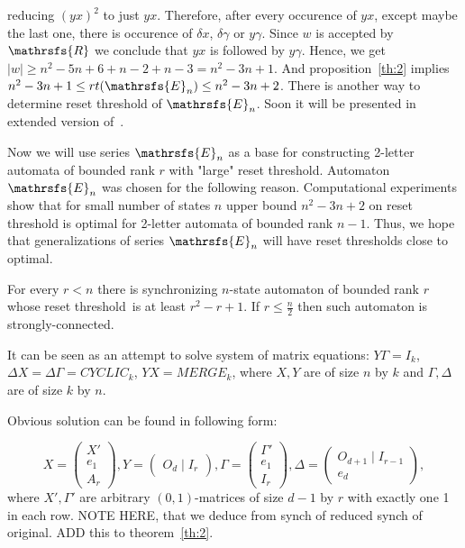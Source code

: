 \documentclass[11pt]{llncs}
\newcommand{\rl}{reset threshold}
\newcommand{\R}{\mathrsfs{R}}
\newcommand{\G}{\Gamma}
\newcommand{\D}{\Delta}
\newcommand{\g}{\gamma}
\newcommand{\dl}{\delta}
\newcommand{\rt}{rt}
\newcommand{\rtc}{rt_{c}}
\begin{document}
reducing $(yx)^2$ to just $yx$. Therefore, after every occurence of $yx$, except maybe the last one, there is occurence 
of $\dl x$, $\dl \g$ or $y \g$. Since $w$ is accepted by $\R$ we conclude that $yx$ is followed by $y\g$.
Hence, we get $|w| \geq n^2 - 5n + 6 + n - 2 + n - 3 = n^2 -3n + 1$.
And proposition~\ref{th:2} implies $n^2 -3n + 1 \leq \rt(\mathrsfs{E}_n) \leq n^2 -3n + 2$. 
There is another way to determine reset threshold of $\mathrsfs{E}_n$. Soon it will be presented in
extended version of~\cite{AGV}.

Now we will use series $\mathrsfs{E}_n$ as a base for constructing 2-letter automata of bounded
rank $r$ with "large" reset threshold. Automaton $\mathrsfs{E}_n$ was chosen for the following reason.
Computational experiments show that for small number of states $n$ upper bound $n^2 -3n +2$ on reset threshold is optimal
for 2-letter automata of bounded rank $n - 1$.
Thus, we hope that generalizations of series $\mathrsfs{E}_n$ will have reset thresholds close to optimal.

\begin{proposition}
For every $r < n$ there is synchronizing $n$-state automaton of bounded rank $r$ whose \rl\ is at least 
$r^2 -r + 1$. If $r \leq \frac{n}{2}$ then such automaton is strongly-connected.
\end{proposition}

It can be seen as an attempt to solve system of matrix equations:
$Y\G = I_{k}$, $\D X = \D \G = CYCLIC_{k}$, $YX = MERGE_{k}$, where $X,Y$ are of size $n$ by $k$ and $\G,\D$ are of
size $k$ by $n$.

Obvious solution can be found in following form:

$$
X =
\left(
\begin{array}{c}
X' \\
e_1 \\
A_r
\end{array}
\right),
Y = 
\left(
\begin{array}{c}
O_d \mid I_r
\end{array}
\right),
\G = 
\left(
\begin{array}{c}
\G' \\
e_1 \\
I_r
\end{array}
\right),
\D = 
\left(
\begin{array}{c}
O_{d + 1} \mid I_{r-1}\\ \hline
e_d
\end{array}
\right),
$$
where $X', \G'$ are arbitrary $(0,1)$-matrices of size $d-1$ by $r$ with exactly one 1
in each row. NOTE HERE, that we deduce from synch of reduced synch of original. ADD this to
theorem~\ref{th:2}.
\end{document}
